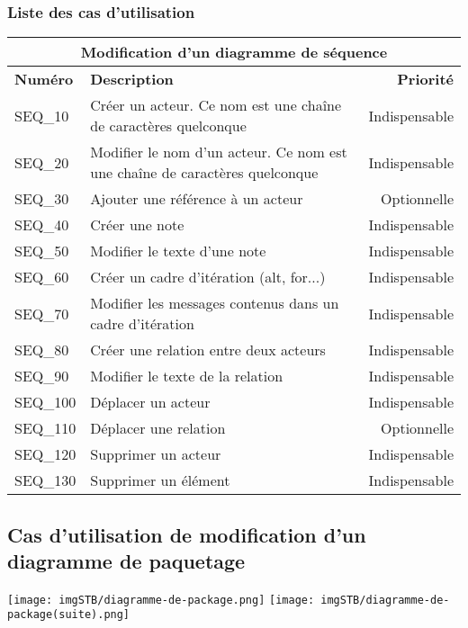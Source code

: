 \documentclass[hidelinks, 10pt,a4paper]{article}
\begin{document}
\subsubsection{Liste des cas d’utilisation}
\begin{center}
    \begin{tabular}{|l|p{8cm}|r|}
        \hline\multicolumn{3}{|c|}{Modification d’un diagramme de séquence} \\\hline
        {\textbf{Numéro}} & {\textbf{Description}} & {\textbf{Priorité}}\\\hline
        {SEQ\_10} & {Créer un acteur. Ce nom est une chaîne de caractères quelconque} & {Indispensable}\\\hline
        {SEQ\_20} & {Modifier le nom d’un acteur. Ce nom est une chaîne de caractères quelconque} & {Indispensable}\\\hline
        {SEQ\_30} & {Ajouter une référence à un acteur} & {Optionnelle}\\\hline
        {SEQ\_40} & {Créer une note} & {Indispensable}\\\hline
        {SEQ\_50} & {Modifier le texte d'une note} & {Indispensable}\\\hline
        {SEQ\_60} & {Créer un cadre d'itération (alt, for...)} & {Indispensable}\\\hline
        {SEQ\_70} & {Modifier les messages contenus dans un cadre d’itération} & {Indispensable}\\\hline
        {SEQ\_80} & {Créer une relation entre deux acteurs} & {Indispensable}\\\hline
        {SEQ\_90} & {Modifier le texte de la relation} & {Indispensable}\\\hline
        {SEQ\_100} & {Déplacer un acteur} & {Indispensable}\\\hline
        {SEQ\_110} & {Déplacer une relation} & {Optionnelle}\\\hline
        {SEQ\_120} & {Supprimer un acteur} & {Indispensable}\\\hline
        {SEQ\_130} & {Supprimer un élément} & {Indispensable}\\\hline
    \end{tabular}
\end{center}

\subsection{Cas d’utilisation de modification d’un diagramme de paquetage}
\begin{center}
    \texttt{[image: imgSTB/diagramme-de-package.png]}
    \texttt{[image: imgSTB/diagramme-de-package(suite).png]}
\end{center}
\end{document}
